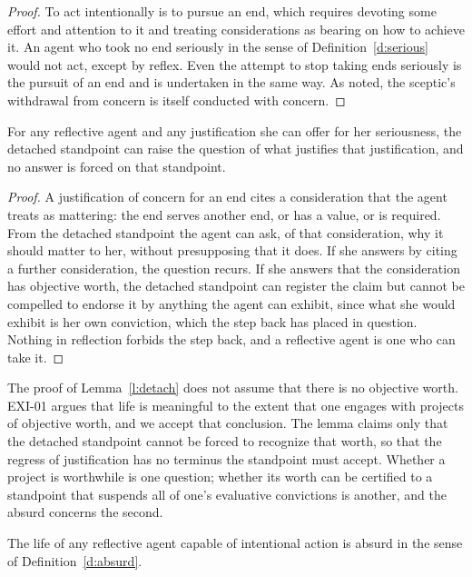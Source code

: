 \documentclass{situationist-preprint}
\begin{document}
\begin{proof}
To act intentionally is to pursue an end, which requires devoting some effort and attention to it and treating considerations as bearing on how to achieve it. An agent who took no end seriously in the sense of Definition~\ref{d:serious} would not act, except by reflex. Even the attempt to stop taking ends seriously is the pursuit of an end and is undertaken in the same way. As \citet{Nagel1971} noted, the sceptic's withdrawal from concern is itself conducted with concern.
\end{proof}

\begin{lemma}\label{l:detach}
For any reflective agent and any justification she can offer for her seriousness, the detached standpoint can raise the question of what justifies that justification, and no answer is forced on that standpoint.
\end{lemma}

\begin{proof}
A justification of concern for an end cites a consideration that the agent treats as mattering: the end serves another end, or has a value, or is required. From the detached standpoint the agent can ask, of that consideration, why it should matter to her, without presupposing that it does. If she answers by citing a further consideration, the question recurs. If she answers that the consideration has objective worth, the detached standpoint can register the claim but cannot be compelled to endorse it by anything the agent can exhibit, since what she would exhibit is her own conviction, which the step back has placed in question. Nothing in reflection forbids the step back, and a reflective agent is one who can take it.
\end{proof}

The proof of Lemma~\ref{l:detach} does not assume that there is no objective worth. EXI-01 argues that life is meaningful to the extent that one engages with projects of objective worth, and we accept that conclusion. The lemma claims only that the detached standpoint cannot be forced to recognize that worth, so that the regress of justification has no terminus the standpoint must accept. Whether a project is worthwhile is one question; whether its worth can be certified to a standpoint that suspends all of one's evaluative convictions is another, and the absurd concerns the second.

\begin{theorem}\label{t:absurd}
The life of any reflective agent capable of intentional action is absurd in the sense of Definition~\ref{d:absurd}.
\end{theorem}
\end{document}
